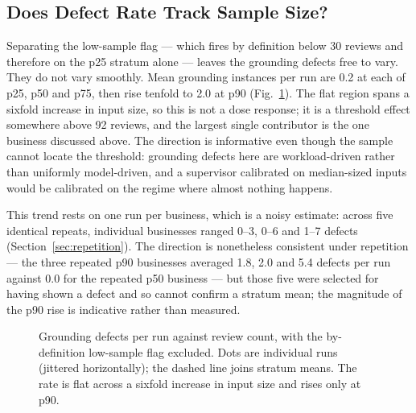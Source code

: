 \documentclass[runningheads]{llncs}
\begin{document}
\subsection{Does Defect Rate Track Sample Size?}

Separating the low-sample flag --- which fires by definition below 30 reviews and
therefore on the p25 stratum alone --- leaves the grounding defects free to vary.
They do not vary smoothly. Mean grounding instances per run are 0.2 at each of
p25, p50 and p75, then rise tenfold to 2.0 at p90 (Fig.~\ref{fig:rate-vs-n}). The
flat region spans a sixfold increase in input size, so this is not a dose
response; it is a threshold effect somewhere above 92 reviews, and the largest
single contributor is the one business discussed above. The direction is
informative even though the sample cannot locate the threshold: grounding defects
here are workload-driven rather than uniformly model-driven, and a supervisor
calibrated on median-sized inputs would be calibrated on the regime where almost
nothing happens.

This trend rests on one run per business, which is a noisy estimate: across five
identical repeats, individual businesses ranged 0--3, 0--6 and 1--7 defects
(Section~\ref{sec:repetition}). The direction is nonetheless consistent under
repetition --- the three repeated p90 businesses averaged 1.8, 2.0 and 5.4 defects
per run against 0.0 for the repeated p50 business --- but those five were selected
for having shown a defect and so cannot confirm a stratum mean; the magnitude of
the p90 rise is indicative rather than measured.

\begin{figure}[t]
\centering
{}
\caption{Grounding defects per run against review count, with the by-definition
low-sample flag excluded. Dots are individual runs (jittered horizontally); the
dashed line joins stratum means. The rate is flat across a sixfold increase in
input size and rises only at p90.}
\label{fig:rate-vs-n}
\end{figure}
\end{document}
